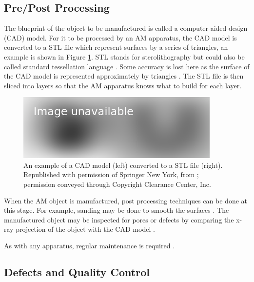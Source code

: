 \subsection{Pre/Post Processing}

The blueprint of the object to be manufactured is called a computer-aided design (CAD) model. For it to be processed by an AM apparatus, the CAD model is converted to a STL file \citep{3d1989sterolithography, 3d2019what} which represent surfaces by a series of triangles, an example is shown in Figure \ref{fig:literature_stl}. STL stands for sterolithography but could also be called standard tessellation language \citep{wong2012review}. Some accuracy is lost here as the surface of the CAD model is represented approximately by triangles \citep{gibson2010additive}. The STL file is then sliced into layers \citep{jamieson1995direct, vatani2009enhanced} so that the AM apparatus knows what to build for each layer.

\begin{figure}
  \centering
  \includegraphics[width=0.9\textwidth]{../figures/literatureReview/literature_stl.png}
  \caption{An example of a CAD model (left) converted to a STL file (right). Republished with permission of Springer New York, from \cite{gibson2010additive}; permission conveyed through Copyright
Clearance Center, Inc.}
  \label{fig:literature_stl}
\end{figure}

When the AM object is manufactured, post processing techniques can be done at this stage. For example, sanding may be done to smooth the surfaces \citep{gibson2010additive}. The manufactured object may be inspected for pores or defects by comparing the x-ray projection of the object with the CAD model \citep{lee2015compliance, villarraga2015assessing, kim2016inspection}.

As with any apparatus, regular maintenance is required \citep{bell2014maintaining}.

\subsection{Defects and Quality Control}

